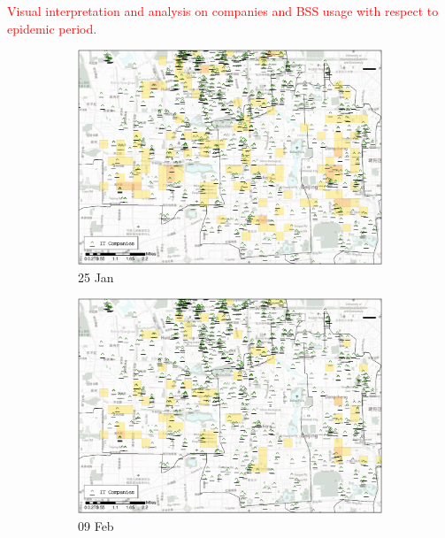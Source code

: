 \documentclass[preprints,ijgi,submit,moreauthors]{Definitions/mdpi}
\begin{document}
\textcolor{red}{Visual interpretation and analysis on companies and BSS usage with respect to epidemic period.}
\begin{figure}[H]
    \centering
    \begin{subfigure}{.23\textwidth}
        \includegraphics[width=\textwidth]{Figures/Relation_with_POIs/POI_compD2020_01_25.eps}
        \caption{25 Jan}
    \end{subfigure}
    \begin{subfigure}{.23\textwidth}
        \includegraphics[width=\textwidth]{Figures/Relation_with_POIs/POI_compD2020_02_09.eps}
        \caption{09 Feb}
    \end{subfigure}
    \begin{subfigure}{.23\textwidth}

\end{subfigure}
\end{figure}
\end{document}
